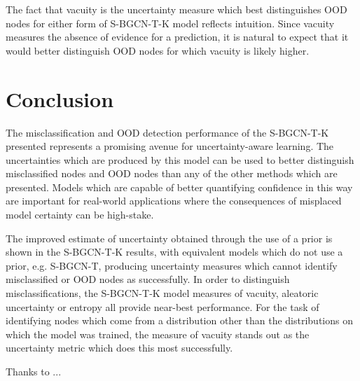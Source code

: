 \documentclass[
twocolumn,
]{ceurart}
\begin{document}
The fact that vacuity is the uncertainty measure which best distinguishes OOD nodes for either form of S-BGCN-T-K model reflects intuition.
Since vacuity measures the absence of evidence for a prediction, it is natural to expect that it would better distinguish OOD nodes for which vacuity is likely higher.

\section{Conclusion}
\label{sec::conclusion}

The misclassification and OOD detection performance of the S-BGCN-T-K presented represents a promising avenue for uncertainty-aware learning.
The uncertainties which are produced by this model can be used to better distinguish misclassified nodes and OOD nodes than any of the other methods which are presented.
Models which are capable of better quantifying confidence in this way are important for real-world applications where the consequences of misplaced model certainty can be high-stake.

The improved estimate of uncertainty obtained through the use of a prior is shown in the S-BGCN-T-K results, with equivalent models which do not use a prior, e.g. S-BGCN-T, producing uncertainty measures which cannot identify misclassified or OOD nodes as successfully.
In order to distinguish misclassifications, the S-BGCN-T-K model measures of vacuity, aleatoric uncertainty or entropy all provide near-best performance.
For the task of identifying nodes which come from a distribution other than the distributions on which the model was trained, the measure of vacuity stands out as the uncertainty metric which does this most successfully.

\begin{acknowledgments}
  Thanks to ...
\end{acknowledgments}


\end{document}
